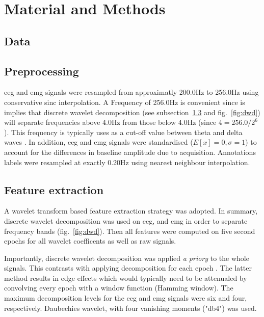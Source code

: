 \section{Material and Methods} \label{matmet}


\subsection{Data}


\subsection{Preprocessing}

\gls{eeg} and \gls{emg} signals were resampled from approximatly 200.0Hz to 256.0Hz using
conservative sinc interpolation. 
A Frequency of 256.0Hz is convenient since is implies that discrete wavelet decomposition (see subsection~\ref{sub:features} and fig.~\ref{fig:dwd}) will separate 
frequencies above 4.0Hz from those below 4.0Hz (since $4 = 256.0/{2^6} $).
This frequency is typically uses as a cut-off value between theta and delta waves \citationneeded{}.
In addition, \gls{eeg} and \gls{emg} signals were standardised ($E[x] = 0, \sigma = 1$) to account for the differences in baseline amplitude due to acquisition.
Annotations labels were resampled at exactly 0.20Hz using nearest neighbour interpolation.

\subsection{Feature extraction}
\label{sub:features}

A wavelet transform based feature extraction strategy was adopted.
In summary, discrete wavelet decomposition was used on \gls{eeg}, and \gls{emg} 
in order to separate frequency bands (fig.~\ref{fig:dwd}).
Then all features were computed on five second epochs for all wavelet coefficents as well as raw signals.




Importantly, discrete wavelet decomposition was applied \emph{a priory} to the whole signals.
This contrasts with applying decomposition for each epoch \citationneeded{}.
The latter method results in edge effects which would typically need to be attenualed by convolving every epoch with a window function (\eg Hamming window).
The maximum decomposition levels for the \gls{eeg} and \gls{emg} signals were six and four, respectively.
Daubechies wavelet, with four vanishing moments ("db4") was used.

